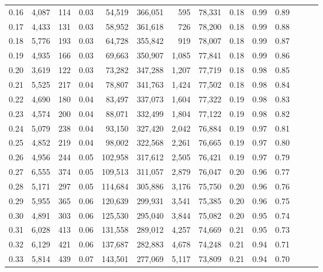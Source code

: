 \begin{tabular}{rrrrrrrrrrrrrr}
0.16 &   4,087 &    114 &  0.03 &   54,519 &  366,051 &     595 &  78,331 &  0.18 &  0.99 &      0.89 \\
0.17 &   4,433 &    131 &  0.03 &   58,952 &  361,618 &     726 &  78,200 &  0.18 &  0.99 &      0.88 \\
0.18 &   5,776 &    193 &  0.03 &   64,728 &  355,842 &     919 &  78,007 &  0.18 &  0.99 &      0.87 \\
0.19 &   4,935 &    166 &  0.03 &   69,663 &  350,907 &   1,085 &  77,841 &  0.18 &  0.99 &      0.86 \\
0.20 &   3,619 &    122 &  0.03 &   73,282 &  347,288 &   1,207 &  77,719 &  0.18 &  0.98 &      0.85 \\
0.21 &   5,525 &    217 &  0.04 &   78,807 &  341,763 &   1,424 &  77,502 &  0.18 &  0.98 &      0.84 \\
0.22 &   4,690 &    180 &  0.04 &   83,497 &  337,073 &   1,604 &  77,322 &  0.19 &  0.98 &      0.83 \\
0.23 &   4,574 &    200 &  0.04 &   88,071 &  332,499 &   1,804 &  77,122 &  0.19 &  0.98 &      0.82 \\
0.24 &   5,079 &    238 &  0.04 &   93,150 &  327,420 &   2,042 &  76,884 &  0.19 &  0.97 &      0.81 \\
0.25 &   4,852 &    219 &  0.04 &   98,002 &  322,568 &   2,261 &  76,665 &  0.19 &  0.97 &      0.80 \\
0.26 &   4,956 &    244 &  0.05 &  102,958 &  317,612 &   2,505 &  76,421 &  0.19 &  0.97 &      0.79 \\
0.27 &   6,555 &    374 &  0.05 &  109,513 &  311,057 &   2,879 &  76,047 &  0.20 &  0.96 &      0.77 \\
0.28 &   5,171 &    297 &  0.05 &  114,684 &  305,886 &   3,176 &  75,750 &  0.20 &  0.96 &      0.76 \\
0.29 &   5,955 &    365 &  0.06 &  120,639 &  299,931 &   3,541 &  75,385 &  0.20 &  0.96 &      0.75 \\
0.30 &   4,891 &    303 &  0.06 &  125,530 &  295,040 &   3,844 &  75,082 &  0.20 &  0.95 &      0.74 \\
0.31 &   6,028 &    413 &  0.06 &  131,558 &  289,012 &   4,257 &  74,669 &  0.21 &  0.95 &      0.73 \\
0.32 &   6,129 &    421 &  0.06 &  137,687 &  282,883 &   4,678 &  74,248 &  0.21 &  0.94 &      0.71 \\
0.33 &   5,814 &    439 &  0.07 &  143,501 &  277,069 &   5,117 &  73,809 &  0.21 &  0.94 &      0.70 \\

\end{tabular}
